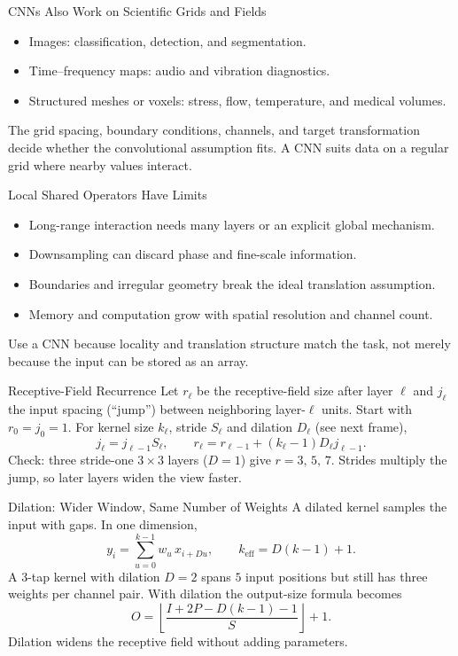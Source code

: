 \documentclass{ntuabeamer}
\begin{document}
\begin{frame}{CNNs Also Work on Scientific Grids and Fields}
  \begin{itemize}
    \item Images: classification, detection, and segmentation.
    \item Time--frequency maps: audio and vibration diagnostics.
    \item Structured meshes or voxels: stress, flow, temperature, and medical volumes.
  \end{itemize}
  The grid spacing, boundary conditions, channels, and target transformation decide whether the convolutional assumption fits.
  A CNN suits data on a regular grid where nearby values interact.
\end{frame}

\begin{frame}{Local Shared Operators Have Limits}
  \begin{itemize}
    \item Long-range interaction needs many layers or an explicit global mechanism.
    \item Downsampling can discard phase and fine-scale information.
    \item Boundaries and irregular geometry break the ideal translation assumption.
    \item Memory and computation grow with spatial resolution and channel count.
  \end{itemize}
  Use a CNN because locality and translation structure match the task, not merely because the input can be stored as an array.
\end{frame}



\appendix


\begin{frame}{Receptive-Field Recurrence}
  Let $r_\ell$ be the receptive-field size after layer $\ell$ and $j_\ell$ the input spacing (``jump'') between neighboring layer-$\ell$ units.
  Start with $r_0=j_0=1$. For kernel size $k_\ell$, stride $S_\ell$ and dilation $D_\ell$ (see next frame),
  \[
    j_\ell=j_{\ell-1}S_\ell,
    \qquad
    r_\ell=r_{\ell-1}+(k_\ell-1)D_\ell j_{\ell-1}.
  \]
  Check: three stride-one $3\times3$ layers ($D=1$) give $r=3,\,5,\,7$.
  Strides multiply the jump, so later layers widen the view faster.
\end{frame}

\begin{frame}{Dilation: Wider Window, Same Number of Weights}
  A dilated kernel samples the input with gaps. In one dimension,
  \[
    y_i=\sum_{u=0}^{k-1}w_u\,x_{i+D u},
    \qquad
    k_{\mathrm{eff}}=D(k-1)+1 .
  \]
  A $3$-tap kernel with dilation $D=2$ spans $5$ input positions but still has three weights per channel pair.
  With dilation the output-size formula becomes
  \[
    O=\left\lfloor\frac{I+2P-D(k-1)-1}{S}\right\rfloor+1 .
  \]
  Dilation widens the receptive field without adding parameters.
\end{frame}
\end{document}
